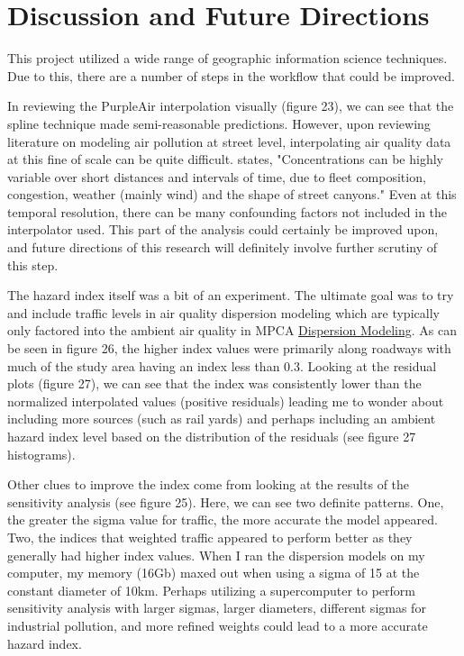 \documentclass[article,12pt]{article}
\numberwithin{equation}{section}
\begin{document}
\section{Discussion and Future Directions}
	
	This project utilized a wide range of geographic information science techniques. Due to this, there are a number of steps in the workflow that could be improved.
	
	In reviewing the PurpleAir interpolation visually (figure 23), we can see that the spline technique made semi-reasonable predictions. However, upon reviewing literature on modeling air pollution at street level, interpolating air quality data at this fine of scale can be quite difficult. \textcite{FOREHEAD} states, "Concentrations can be highly variable over short distances and intervals of time, due to fleet composition, congestion, weather (mainly wind) and the shape of street canyons." Even at this temporal resolution, there can be many confounding factors not included in the interpolator used. This part of the analysis could certainly be improved upon, and future directions of this research will definitely involve further scrutiny of this step.
	
	The hazard index itself was a bit of an experiment. The ultimate goal was to try and include traffic levels in air quality dispersion modeling which are typically only factored into the ambient air quality in MPCA \href{https://www.pca.state.mn.us/sites/default/files/aq2-58.pdf}{Dispersion Modeling}. As can be seen in figure 26, the higher index values were primarily along roadways with much of the study area having an index less than 0.3. Looking at the residual plots (figure 27), we can see that the index was consistently lower than the normalized interpolated values (positive residuals) leading me to wonder about including more sources (such as rail yards) and perhaps including an ambient hazard index level based on the distribution of the residuals (see figure 27 histograms). 
	
	Other clues to improve the index come from looking at the results of the sensitivity analysis (see figure 25). Here, we can see two definite patterns. One, the greater the sigma value for traffic, the more accurate the model appeared. Two, the indices that weighted traffic appeared to perform better as they generally had higher index values. When I ran the dispersion models on my computer, my memory (16Gb) maxed out when using a sigma of 15 at the constant diameter of 10km. Perhaps utilizing a supercomputer to perform sensitivity analysis with larger sigmas, larger diameters, different sigmas for industrial pollution, and more refined weights could lead to a more accurate hazard index.
	
\end{document}
